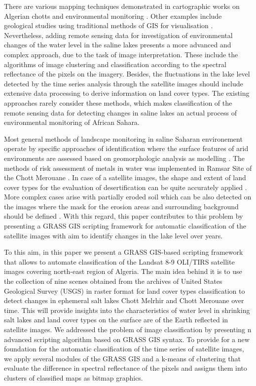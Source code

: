 \documentclass[asi,article,submit,pdftex,moreauthors]{Definitions/mdpi}
\begin{document}
There are various mapping techniques demonstrated in cartographic works on Algerian chotts and environmental monitoring \cite{ABDENNOUR2020100087,OUERDACHI2012426,HADOUR2020100671}. Other examples include geological studies using traditional methods of GIS for visualisation \cite{RAHAL2021104983,LAOUINI201959,HADDANE2017228}. Nevertheless, adding remote sensing data for investigation of environmental changes of the water level in the saline lakes presents a more advanced and complex approach, due to the task of image interpretation. These include the algorithms of image clustering and classification according to the spectral reflectance of the pixels on the imagery. Besides, the fluctuations in the lake level detected by the time series analysis through the satellite images should include extensive data processing to derive information on land cover types. The existing approaches rarely consider these methods, which makes classification of the remote sensing data for detecting changes in saline lakes an actual process of environmental monitoring of African Sahara. 

Most general methods of landscape monitoring in saline Saharan environement operate by specific approaches of identification where the surface features of arid environments are assessed based on geomorphologic analysis as modelling \cite{Callot}. The methods of risk assessment of metals in water  was implemented in Ramsar Site of the Chott Merouane \cite{Benhaddya}. In case of a satellite images, the shape and extent of land cover types for the evaluation of desertification can be quite accurately applied \cite{oussedik2003realisation}. More complex cases arise with partially eroded soil which can be also detected on the images where the mask for the erosion areas and surrounding background should be defined \cite{Toumietal}. With this regard, this paper contributes to this problem by presenting a GRASS GIS scripting framework for automatic classification of the satellite images with aim to identify changes in the lake level over years.

To this aim, in this paper we present a GRASS GIS-based scripting framework that allows to automate classification of the Landsat 8-9 OLI/TIRS satellite images covering north-east region of Algeria. The main idea behind it is to use the collection of nine scenes obtained from the archives of United States Geological Survey (USGS) in raster format for land cover types classification to detect changes in ephemeral salt lakes Chott Melrhir and Chott Merouane over time. This will provide insights into the characteristics of water level in shrinking salt lakes and land cover types on the surface are of the Earth reflected in satellite images. We addressed the problem of image classification by presenting n advanced scripting algorithm based on GRASS GIS syntax. To provide for a new foundation for the automatic classification of the time series of satellite images, we apply several modules of the GRASS GIS and a k-means of clustering that evaluate the difference in spectral reflectance of the pixels and assigns them into clusters of classified maps as bitmap graphics. 
\end{document}
